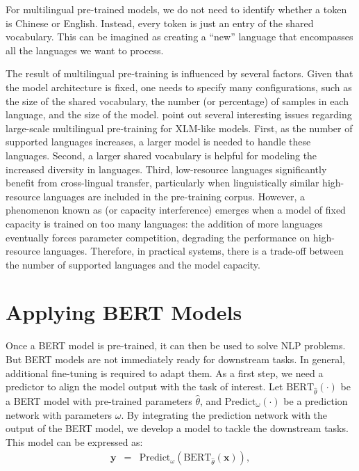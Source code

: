 \noindent For multilingual pre-trained models, we do not need to identify whether a token is Chinese or English. Instead, every token is just an entry of the shared vocabulary. This can be imagined as creating a ``new'' language that encompasses all the languages we want to process.

The result of multilingual pre-training is influenced by several factors. Given that the model architecture is fixed, one needs to specify many configurations, such as the size of the shared vocabulary, the number (or percentage) of samples in each language, and the size of the model. \citet{conneau-etal:2020unsupervised} point out several interesting issues regarding large-scale multilingual pre-training for XLM-like models. First, as the number of supported languages increases, a larger model is needed to handle these languages. Second, a larger shared vocabulary is helpful for modeling the increased diversity in languages. Third, low-resource languages significantly benefit from cross-lingual transfer, particularly when linguistically similar high-resource languages are included in the pre-training corpus.  However, a phenomenon known as  (or capacity interference) emerges when a model of fixed capacity is trained on too many languages: the addition of more languages eventually forces parameter competition, degrading the performance on high-resource languages. Therefore, in practical systems, there is a trade-off between the number of supported languages and the model capacity.


\section{Applying BERT Models}
\label{sec:pre-training-application}

\noindent Once a BERT model is pre-trained, it can then be used to solve NLP problems. But BERT models are not immediately ready for downstream tasks. In general, additional fine-tuning is required to adapt them. As a first step, we need a predictor to align the model output with the task of interest. Let $\mathrm{BERT}_{\hat{\theta}}(\cdot)$ be a BERT model with pre-trained parameters $\hat{\theta}$, and $\mathrm{Predict}_{\omega}(\cdot)$ be a prediction network with parameters $\omega$. By integrating the prediction network with the output of the BERT model, we develop a model to tackle the downstream tasks. This model can be expressed as:
\begin{eqnarray}
\mathbf{y} & = & \mathrm{Predict}_{\omega}(\mathrm{BERT}_{\hat{\theta}}(\mathbf{x})),
\end{eqnarray}

